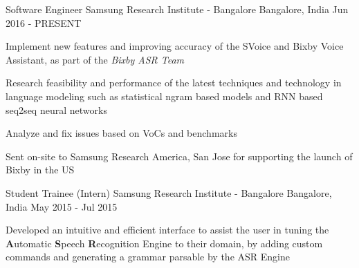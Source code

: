 

\begin{cventries}

  \cventry
    {Software Engineer} %
    {Samsung Research Institute - Bangalore} %
    {Bangalore, India} %
    {Jun 2016 - PRESENT} %
    {
      \begin{cvitems}
      \item{Implement new features and improving accuracy of the SVoice and Bixby Voice Assistant, as part of the \textit{Bixby ASR Team}}
      \item{Research feasibility and performance of the latest techniques and technology in language modeling such as statistical ngram based models and RNN based seq2seq neural networks}
      \item{Analyze and fix issues based on VoCs and benchmarks}
      \item{Sent on-site to Samsung Research America, San Jose for supporting the launch of Bixby in the US}
      \end{cvitems}
    }

  \cventry
    {Student Trainee (Intern)} %
    {Samsung Research Institute - Bangalore} %
    {Bangalore, India} %
    {May 2015 - Jul 2015} %
    {
      \begin{cvitems}
      \item{Developed an intuitive and efficient interface to assist the user in tuning the \textbf{A}utomatic  \textbf{S}peech \textbf{R}ecognition Engine to their domain, by adding custom commands and generating a grammar parsable by the ASR  Engine}
      \end{cvitems}
    }


\end{cventries}

